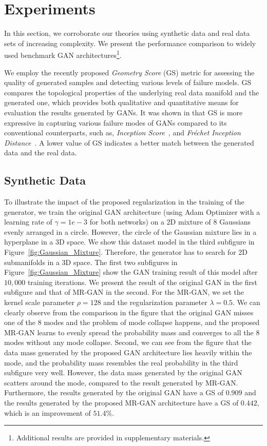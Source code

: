 \documentclass[10pt,twocolumn,letterpaper]{article}
\begin{document}
\section{Experiments}
In this section, we corroborate our theories using synthetic data
and real data sets of increasing complexity. We present the performance comparison to widely used benchmark GAN architectures\footnote{Additional results are provided in supplementary materials.}. 

We employ the recently proposed {\emph{Geometry Score} (GS)} metric \cite{khrulkov2018geometry} for assessing the quality of generated samples and detecting various levels of failure models. GS compares the topological properties of the underlying real data manifold and the generated
one, which provides both qualitative and quantitative means for evaluation the results generated by GANs. It was shown in \cite{khrulkov2018geometry} that GS is more expressive in capturing various failure modes of GANs compared to its conventional counterparts, such as, \emph{Inception Score}~\cite{salimans2016improved}, and \emph{Fr\'echet Inception Distance}~\cite{heusel2017gans}. A lower value of GS indicates a better match between the generated data and the real data.

\subsection{Synthetic Data}
To illustrate the impact of the proposed regularization in the training of the generator, we train the original GAN architecture \cite{goodfellow2014generative} (using Adam Optimizer with a learning rate of $\gamma=1e-3$ for both networks) on a 2D mixture of $8$ Gaussians evenly arranged in a circle. However, the circle of the Gaussian mixture lies in a hyperplane in a 3D space. We show this dataset model in the third subfigure in Figure~\ref{fig:Gaussian_Mixture}. Therefore, the generator has to search for 2D submanifolds in a 3D space. The first two subfigures in Figure~\ref{fig:Gaussian_Mixture} show the GAN training result of this model after $10,000$ training iterations. We present the result of the original GAN in the first subfigure and that of MR-GAN in the second. For the MR-GAN, we set the kernel  scale parameter $\rho=128$ and the regularization parameter $\lambda=0.5$. We can clearly observe from the comparison in the figure that the original GAN misses one of the $8$ modes and the problem of mode collapse happens, and the proposed MR-GAN learns to evenly spread the probability mass and converges to all the $8$ modes without any mode collapse. Second, we can see from the figure that the data mass generated by the proposed GAN architecture lies heavily within the mode, and the probability mass resembles the real probability in the third subfigure very well. However, the data mass generated by the original GAN scatters around the mode, compared to the result generated by MR-GAN. Furthermore, the results generated by the original GAN have a GS of $0.909$ and the results generated by the proposed MR-GAN architecture have a GS of $0.442$, which is an improvement of $51.4\%$.
\end{document}
